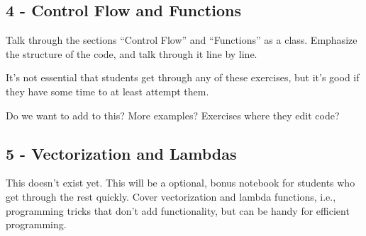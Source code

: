 \documentclass[11pt]{article}
\begin{document}
\subsection*{4 - Control Flow and Functions}

Talk through the sections ``Control Flow'' and ``Functions'' as a class. Emphasize the structure of the code, and talk through it line by line.

It's not essential that students get through any of these exercises, but it's good if they have some time to at least attempt them.

{\color{red} Do we want to add to this? More examples? Exercises where they edit code?}

\subsection*{\color{red} 5 - Vectorization and Lambdas}

{\color{red} This doesn't exist yet. This will be a optional, bonus notebook for students who get through the rest quickly. Cover vectorization and lambda functions, i.e., programming tricks that don't add functionality, but can be handy for efficient programming.}
\end{document}
